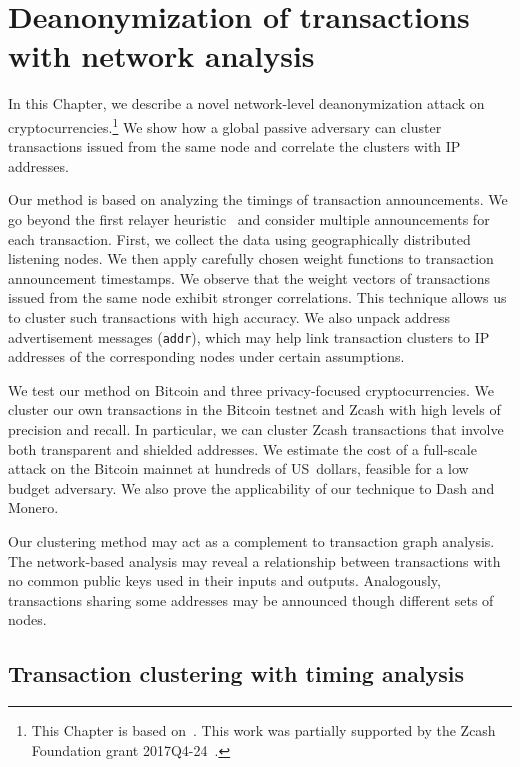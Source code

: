\chapter{Deanonymization of transactions with network analysis}

\label{Chapter03Clustering}

In this Chapter, we describe a novel network-level deanonymization attack on cryptocurrencies.\footnote{This Chapter is based on~\cite{Biryukov2019a, Biryukov2019b}. This work was partially supported by the Zcash Foundation grant 2017Q4-24~\cite{Feher2017}.}
We show how a global passive adversary can cluster transactions issued from the same node and correlate the clusters with IP addresses.

Our method is based on analyzing the timings of transaction announcements.
We go beyond the first relayer heuristic~\cite{Biryukov2014, Koshy2014} and consider multiple announcements for each transaction.
First, we collect the data using geographically distributed listening nodes.
We then apply carefully chosen weight functions to transaction announcement timestamps.
We observe that the weight vectors of transactions issued from the same node exhibit stronger correlations.
This technique allows us to cluster such transactions with high accuracy.
We also unpack address advertisement messages (\texttt{addr}), which may help link transaction clusters to IP addresses of the corresponding nodes under certain assumptions.

We test our method on Bitcoin and three privacy-focused cryptocurrencies.
We cluster our own transactions in the Bitcoin testnet and Zcash with high levels of precision and recall.
In particular, we can cluster Zcash transactions that involve both transparent and shielded addresses.
We estimate the cost of a full-scale attack on the Bitcoin mainnet at hundreds of US~dollars, feasible for a low budget adversary.
We also prove the applicability of our technique to Dash and Monero.

Our clustering method may act as a complement to transaction graph analysis.
The network-based analysis may reveal a relationship between transactions with no common public keys used in their inputs and outputs.
Analogously, transactions sharing some addresses may be announced though different sets of nodes.


\section{Transaction clustering with timing analysis}  \label{sec:Ch03Ourapproach}

